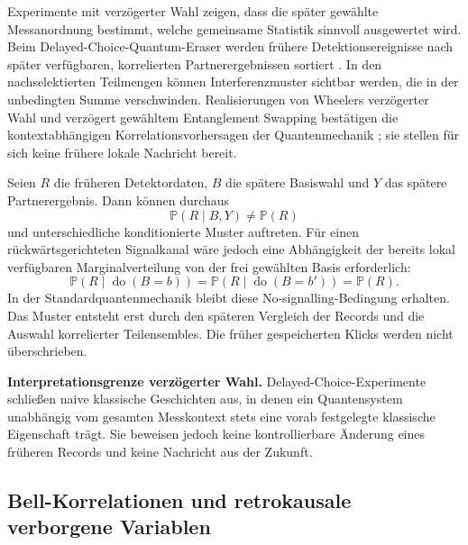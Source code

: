 \documentclass[11pt,a4paper]{article}
\theoremstyle{remark}
\newcommand{\statusbox}[2]{%
  \par\medskip\noindent
  \colorbox{#1}{\parbox{\dimexpr\linewidth-2\fboxsep\relax}{#2}}%
  \par\medskip
}
\begin{document}
Experimente mit verzögerter Wahl zeigen, dass die später gewählte
Messanordnung bestimmt, welche gemeinsame Statistik sinnvoll ausgewertet
wird. Beim Delayed-Choice-Quantum-Eraser werden frühere Detektionsereignisse
nach später verfügbaren, korrelierten Partnerergebnissen sortiert
\citep{ScullyDruehl1982,KimEtAl2000}. In den nachselektierten Teilmengen können Interferenzmuster
sichtbar werden, die in der unbedingten Summe verschwinden.
Realisierungen von Wheelers verzögerter Wahl und verzögert gewähltem
Entanglement Swapping bestätigen die kontextabhängigen
Korrelationsvorhersagen der Quantenmechanik
\citep{JacquesEtAl2007,MaEtAl2012}; sie stellen für sich keine frühere
lokale Nachricht bereit.

Seien \(R\) die früheren Detektordaten, \(B\) die spätere Basiswahl und \(Y\)
das spätere Partnerergebnis. Dann können durchaus
\[
  \mathbb P(R\mid B,Y)
  \neq
  \mathbb P(R)
\]
und unterschiedliche konditionierte Muster auftreten. Für einen
rückwärtsgerichteten Signalkanal wäre jedoch eine Abhängigkeit der bereits
lokal verfügbaren Marginalverteilung von der frei gewählten Basis erforderlich:
\begin{equation}
\label{eq:no-back-signal}
  \mathbb P(R\mid\operatorname{do}(B=b))
  =
  \mathbb P(R\mid\operatorname{do}(B=b'))
  =\mathbb P(R).
\end{equation}
In der Standardquantenmechanik bleibt diese No-signalling-Bedingung erhalten.
Das Muster entsteht erst durch den späteren Vergleich der Records und die
Auswahl korrelierter Teilensembles. Die früher gespeicherten Klicks werden
nicht überschrieben.

\statusbox{QAmber}{
\textbf{Interpretationsgrenze verzögerter Wahl.}
Delayed-Choice-Experimente schließen naive klassische Geschichten aus, in
denen ein Quantensystem unabhängig vom gesamten Messkontext stets eine
vorab festgelegte klassische Eigenschaft trägt. Sie beweisen jedoch keine
kontrollierbare Änderung eines früheren Records und keine Nachricht aus der
Zukunft.
}

\subsection{Bell-Korrelationen und retrokausale verborgene Variablen}
\end{document}
